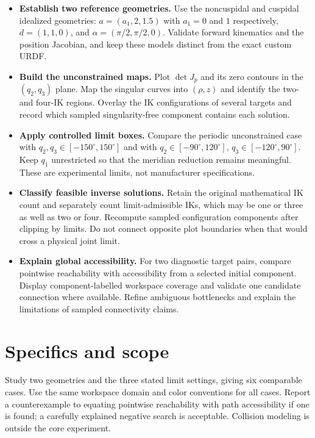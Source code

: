 \documentclass[11pt,a4paper]{article}
\begin{document}
\begin{itemize}
  \item \textbf{Establish two reference geometries.} Use the noncuspidal and cuspidal
idealized geometries: $a=(a_1,2,1.5)$ with $a_1=0$ and $1$ respectively,
$d=(1,1,0)$, and $\alpha=(\pi/2,\pi/2,0)$. Validate forward kinematics and the
position Jacobian, and keep these models distinct from the exact custom URDF.

  \item \textbf{Build the unconstrained maps.} Plot $\det J_p$ and its zero contours in
the $(q_2,q_3)$ plane. Map the singular curves into $(\rho,z)$ and identify
the two- and four-IK regions. Overlay the IK configurations of several targets
and record which sampled singularity-free component contains each solution.

  \item \textbf{Apply controlled limit boxes.} Compare the periodic unconstrained case
with $q_2,q_3\in[-150^\circ,150^\circ]$ and with
$q_2\in[-90^\circ,120^\circ]$, $q_3\in[-120^\circ,90^\circ]$.
Keep $q_1$ unrestricted so that the meridian reduction remains meaningful.
These are experimental limits, not manufacturer specifications.

  \item \textbf{Classify feasible inverse solutions.} Retain the original mathematical
IK count and separately count limit-admissible IKs, which may be one or three
as well as two or four. Recompute sampled configuration components after
clipping by limits. Do not connect opposite plot boundaries when that would
cross a physical joint limit.

  \item \textbf{Explain global accessibility.} For two diagnostic target pairs, compare
pointwise reachability with accessibility from a selected initial component.
Display component-labelled workspace coverage and validate one candidate
connection where available. Refine ambiguous bottlenecks and explain the
limitations of sampled connectivity claims.
\end{itemize}

\newpage
\section*{Specifics and scope}
Study two geometries and the three stated limit settings, giving six
comparable cases. Use the same workspace domain and color conventions for all
cases. Report a counterexample to equating pointwise reachability with path
accessibility if one is found; a carefully explained negative search is acceptable.
Collision modeling is outside the core experiment.
\end{document}
